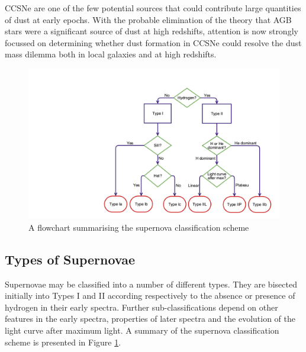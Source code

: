 CCSNe are one of the few potential sources that could contribute large quantities of dust at early epochs.  With the probable elimination of the theory that AGB stars were a significant source of dust at high redshifts, attention is now strongly focussed on determining whether dust formation in CCSNe could resolve the dust mass dilemma both in local galaxies and at high redshifts.

\begin{figure}
\centering
\includegraphics[clip=true, scale = 0.2, trim= 930 50 55 210]{chapters/chapter1/figs/sn_classification.png}
\caption{A flowchart summarising the supernova classification scheme}
\label{intro:fig:sn_class}
\end{figure}

\subsection{Types of Supernovae}

Supernovae may be classified into a number of different types.  They are bisected initially into Types I and II according respectively to the absence or presence of hydrogen in their early spectra.  Further sub-classifications depend on  other features in the early spectra, properties of later spectra and the evolution of the  light curve after maximum light.  A summary of the supernova classification scheme is presented in Figure \ref{intro:fig:sn_class}.  


